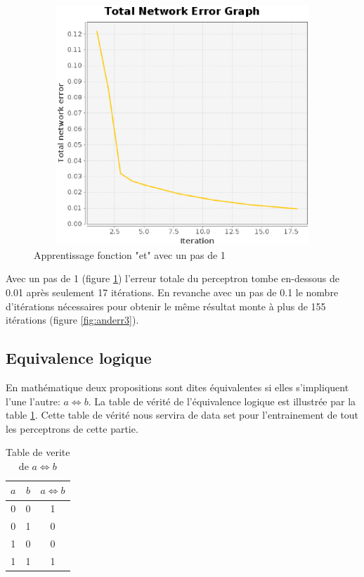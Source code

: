 \documentclass[twoside,openright,a4paper,11pt,french]{article}
\begin{document}
\begin{figure}[ht]
\centering
\includegraphics[width=12cm,height=9cm]{./pics/and_error4.eps}
\caption{Apprentissage fonction "et" avec un pas de 1}
\label{fig:anderr4}
\end{figure}

Avec un pas de 1 (figure \ref{fig:anderr4}) l'erreur totale du perceptron
tombe en-dessous de 0.01 après seulement 17 itérations. En revanche avec 
un pas de 0.1 le nombre d'itérations nécessaires pour obtenir le même
résultat monte à plus de 155 itérations (figure \ref{fig:anderr3}).

\clearpage
\subsection{Equivalence logique}
En mathématique deux propositions sont dites équivalentes si elles s'impliquent
l'une l'autre: $a \Leftrightarrow b$. La table de vérité de l'équivalence
logique est illustrée par la table \ref{tab:eq}.
Cette table de vérité nous servira de data set pour l'entrainement de tout
les perceptrons de cette partie.


\begin{table}[ht]
  \centering
  \begin{tabular}{| c | c | c |}
    \hline
    \textbf{$a$} & \textbf{$b$} & \textbf{$a \Leftrightarrow b$}\\
    \hline
    0 & 0  & 1 \\
    \hline
    0 & 1  & 0 \\
    \hline
    1 & 0  & 0 \\
    \hline
    1 & 1  & 1 \\
    \hline
  \end{tabular}
  \caption{Table de verite de $a \Leftrightarrow b$}
  \label{tab:eq}
\end{table}
\end{document}
